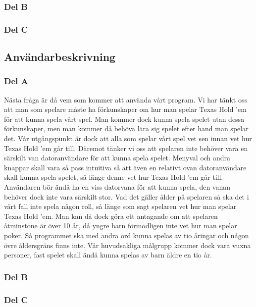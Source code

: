 \documentclass[10pt,a4paper]{article}
\begin{document}
\subsubsection*{Del B}

\subsubsection*{Del C}

\subsection*{Användarbeskrivning}

\subsubsection*{Del A}

Nästa fråga är då vem som kommer att använda vårt program. Vi har tänkt oss
att man som spelare måste ha förkunskaper om hur man spelar Texas Hold ’em
för att kunna spela vårt spel. Man kommer dock kunna spela spelet utan
dessa förkunskaper, men man kommer då behöva lära sig spelet efter hand man
spelar det. Vår utgångspunkt är dock att alla som spelar vårt spel vet sen
innan vet hur Texas Hold ’em går till. Däremot tänker vi oss att spelaren
inte behöver vara en särskilt van datoranvändare för att kunna spela
spelet. Menyval och andra knappar skall vara så pass intuitiva så att även
en relativt ovan datoranvändare skall kunna spela spelet, så länge denne
vet hur Texas Hold ’em går till. Användaren bör ändå ha en viss datorvana
för att kunna spela, den vanan behöver dock inte vara särskilt stor. Vad
det gäller ålder på spelaren så ska det i vårt fall inte spela någon roll,
så länge som sagt spelaren vet hur man spelar Texas Hold ’em. Man kan då
dock göra ett antagande om att spelaren åtminstone är över 10 år, då yngre
barn förmodligen inte vet hur man spelar poker. Så programmet ska med andra
ord kunna spelas av tio åringar och någon övre åldersgräns finns inte. Vår
huvudsakliga målgrupp kommer dock vara vuxna personer, fast spelet skall
ändå kunna spelas av barn äldre en tio år.

\subsubsection*{Del B}

\subsubsection*{Del C}
\end{document}
